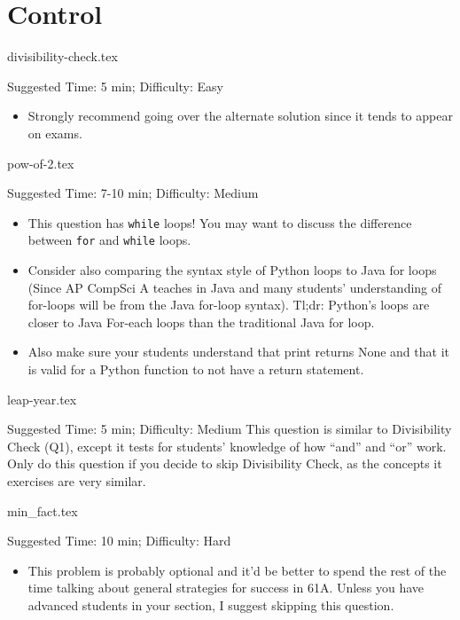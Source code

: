 \documentclass{exam}
\begin{document}
\section{Control}
\begin{questions}
    {divisibility-check.tex}
    \begin{questionmeta}
        Suggested Time: 5 min; Difficulty: Easy
        \begin{itemize}
            \item Strongly recommend going over the alternate solution since it tends to appear on exams.
        \end{itemize}
    \end{questionmeta}

    {pow-of-2.tex}
    \begin{questionmeta}
        Suggested Time: 7-10 min; Difficulty: Medium
        \begin{itemize}
            \item This question has \lstinline{while} loops! You may want to discuss the difference between \lstinline{for} and \lstinline{while} loops. 
            \item Consider also comparing the syntax style of Python loops to Java for loops (Since AP CompSci A teaches in Java and many students' understanding of for-loops will be from the Java for-loop syntax). Tl;dr: Python's loops are closer to Java For-each loops than the traditional Java for loop.
            \item Also make sure your students understand that print returns None and that it is valid for a Python function to not have a return statement.
        \end{itemize}
    \end{questionmeta}

    {leap-year.tex}
    \begin{questionmeta}
    Suggested Time: 5 min; Difficulty: Medium
    This question is similar to Divisibility Check (Q1), except it tests for students' knowledge of how ``and'' and ``or'' work.
    Only do this question if you decide to skip Divisibility Check, as the concepts it exercises are very similar.
    \end{questionmeta}

    {min_fact.tex}
    \begin{questionmeta}
        Suggested Time: 10 min; Difficulty: Hard
        \begin{itemize}
            \item This problem is probably optional and it'd be better to spend the rest of the time talking about general strategies for success in 61A. Unless you have advanced students in your section, I suggest skipping this question.
        \end{itemize}
    \end{questionmeta}
\end{questions}
\end{document}
